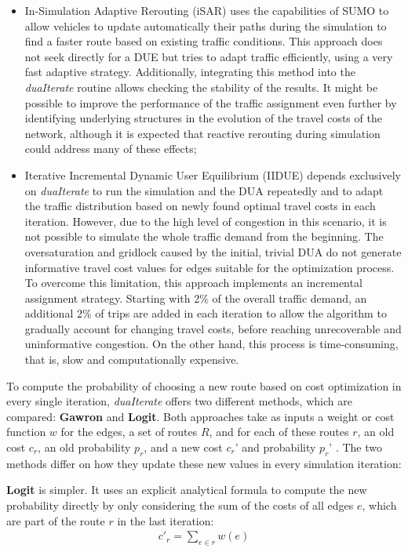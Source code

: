 \begin{itemize}
    \item In-Simulation Adaptive Rerouting (iSAR) uses the capabilities of SUMO to allow vehicles to update automatically their paths during the simulation to find a faster route based on existing traffic conditions. This approach does not seek directly for a DUE but tries to adapt traffic efficiently, using a very fast adaptive strategy. Additionally, integrating this method into the \emph{duaIterate} routine allows checking the stability of the results. It might be possible to improve the performance of the traffic assignment even further by identifying underlying structures in the evolution of the travel costs of the network, although it is expected that reactive rerouting during simulation could address many of these effects;
    \item Iterative Incremental Dynamic User Equilibrium (IIDUE) depends exclusively on \emph{duaIterate} to run the simulation and the DUA repeatedly and to adapt the traffic distribution based on newly found optimal travel costs in each iteration. However, due to the high level of congestion in this scenario, it is not possible to simulate the whole traffic demand from the beginning. The oversaturation and gridlock caused by the initial, trivial DUA do not generate informative travel cost values for edges suitable for the optimization process. To overcome this limitation, this approach implements an incremental assignment strategy. Starting with 2\% of the overall traffic demand, an additional 2\% of trips are added in each iteration to allow the algorithm to gradually account for changing travel costs, before reaching unrecoverable and uninformative congestion. On the other hand, this process is time-consuming, that is, slow and computationally expensive.
\end{itemize}

To compute the probability of choosing a new route based on cost optimization in every single iteration, \emph{duaIterate} offers two different methods, which are compared: \textbf{Gawron} and \textbf{Logit}. Both approaches take as inputs a weight or cost function $w$ for the edges, a set of routes $R$, and for each of these routes $r$, an old cost $c_r$, an old probability $p_r$, and a new cost $c_{r}’$ and probability $p_{r}’$ \citep{GermanAerospaceCenterDLRandothers2021e}. The two methods differ on how they update these new values in every simulation iteration:

\textbf{Logit} is simpler. It uses an explicit analytical formula to compute the new probability directly by only considering the sum of the costs of all edges $e$, which are part of the route $r$ in the last iteration:
\begin{align}
    c'_r = \sum_{e \in r} w(e) \label{eq:logit}
\end{align}

